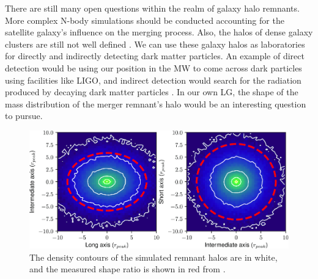\documentclass[linenumbers, twocolumn]{aastex631}
\begin{document}
There are still many open questions within the realm of galaxy halo remnants.
More complex N-body simulations should be conducted accounting for the satellite galaxy's influence on the merging process. Also, the halos of dense galaxy clusters are still not well defined \citep{2019drakos}.
We can use these galaxy halos as laboratories for directly and indirectly detecting dark matter particles. An example of direct detection would be using our position in the MW to come across dark particles using facilities like LIGO, and indirect detection would search for the radiation produced by decaying dark matter particles \citep{2012Frenk_White}. In our own LG, the shape of the mass distribution of the merger remnant's halo would be an interesting question to pursue.
\begin{figure}[ht]
    \centering
    \includegraphics[scale=0.5]{drakos_fig_6.png}
    \caption{The density contours of the simulated remnant halos are in white, and the measured shape ratio is shown in red from \cite{2019drakos}.}
    \label{fig:drakos}
\end{figure}
\end{document}
